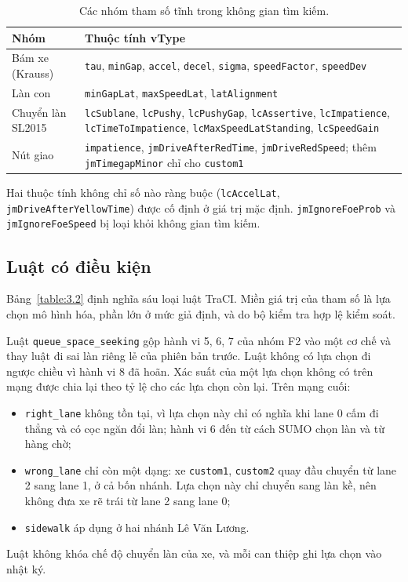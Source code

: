 \documentclass[../DoAn.tex]{subfiles}
\begin{document}
\begin{table}[ht]
\centering
\small
\caption{Các nhóm tham số tĩnh trong không gian tìm kiếm.}
\label{table:3.1b}
\begin{tabular}{|p{4.2cm}|p{9.8cm}|}
\hline
\textbf{Nhóm} & \textbf{Thuộc tính vType} \\
\hline
Bám xe (Krauss) & \texttt{tau}, \texttt{minGap}, \texttt{accel}, \texttt{decel}, \texttt{sigma}, \texttt{speedFactor}, \texttt{speedDev} \\
\hline
Làn con & \texttt{minGapLat}, \texttt{maxSpeedLat}, \texttt{latAlignment} \\
\hline
Chuyển làn SL2015 & \texttt{lcSublane}, \texttt{lcPushy}, \texttt{lcPushyGap}, \texttt{lcAssertive}, \texttt{lcImpatience}, \texttt{lcTimeToImpatience}, \texttt{lcMaxSpeedLatStanding}, \texttt{lcSpeedGain} \\
\hline
Nút giao & \texttt{impatience}, \texttt{jmDriveAfterRedTime}, \texttt{jmDriveRedSpeed}; thêm \texttt{jmTimegapMinor} chỉ cho \texttt{custom1} \\
\hline
\end{tabular}
\end{table}

Hai thuộc tính không chỉ số nào ràng buộc (\texttt{lcAccelLat}, \texttt{jmDriveAfterYellowTime}) được cố định ở giá trị mặc định. \texttt{jmIgnoreFoeProb} và \texttt{jmIgnoreFoeSpeed} bị loại khỏi không gian tìm kiếm.

\subsection{Luật có điều kiện}

Bảng~\ref{table:3.2} định nghĩa sáu loại luật TraCI. Miền giá trị của tham số là lựa chọn mô hình hóa, phần lớn ở mức giả định, và do bộ kiểm tra hợp lệ kiểm soát.

Luật \texttt{queue\_space\_seeking} gộp hành vi 5, 6, 7 của nhóm F2 vào một cơ chế và thay luật đi sai làn riêng lẻ của phiên bản trước. Luật không có lựa chọn đi ngược chiều vì hành vi 8 đã hoãn. Xác suất của một lựa chọn không có trên mạng được chia lại theo tỷ lệ cho các lựa chọn còn lại. Trên mạng cuối:
\begin{itemize}
    \item \texttt{right\_lane} không tồn tại, vì lựa chọn này chỉ có nghĩa khi lane 0 cấm đi thẳng và có cọc ngăn đổi làn; hành vi 6 đến từ cách SUMO chọn làn và từ hàng chờ;
    \item \texttt{wrong\_lane} chỉ còn một dạng: xe \texttt{custom1}, \texttt{custom2} quay đầu chuyển từ lane 2 sang lane 1, ở cả bốn nhánh. Lựa chọn này chỉ chuyển sang làn kề, nên không đưa xe rẽ trái từ lane 2 sang lane 0;
    \item \texttt{sidewalk} áp dụng ở hai nhánh Lê Văn Lương.
\end{itemize}
Luật không khóa chế độ chuyển làn của xe, và mỗi can thiệp ghi lựa chọn vào nhật ký.
\end{document}
